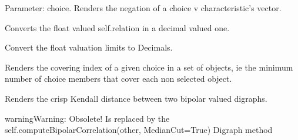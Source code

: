 \documentclass[letterpaper,10pt,english]{sphinxmanual}
\begin{document}
\begin{fulllineitems}
\begin{fulllineitems}
\end{fulllineitems}


\begin{fulllineitems}
\label{techDoc:digraphs.Digraph.contra}
Parameter: choice.
Renders the negation of a choice v characteristic's vector.

\end{fulllineitems}


\begin{fulllineitems}
\label{techDoc:digraphs.Digraph.convertRelationToDecimal}
Converts the float valued self.relation in a decimal valued one.

\end{fulllineitems}


\begin{fulllineitems}
\label{techDoc:digraphs.Digraph.convertValuationToDecimal}
Convert the float valuation limits to Decimals.

\end{fulllineitems}


\begin{fulllineitems}
\label{techDoc:digraphs.Digraph.coveringIndex}
Renders the covering index of a given choice in a set of objects,
ie the minimum number of choice members that cover each
non selected object.

\end{fulllineitems}


\begin{fulllineitems}
\label{techDoc:digraphs.Digraph.crispKDistance}
Renders the crisp Kendall distance between two bipolar valued
digraphs.

\begin{notice}{warning}{Warning:}
Obsolete! Is replaced by the self.computeBipolarCorrelation(other, MedianCut=True) Digraph method
\end{notice}


\end{fulllineitems}
\end{fulllineitems}
\end{document}
